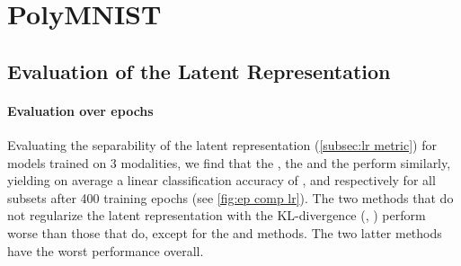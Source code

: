 \section{PolyMNIST} \label{subsec: results polymnist}

\subsection{Evaluation of the Latent Representation}

\paragraph{Evaluation over epochs}
Evaluating the separability of the latent representation (\cref{subsec:lr metric}) for models trained on 3 modalities, we find that the , the  and the  perform similarly, yielding on average a linear classification accuracy of ,  and  respectively for all subsets after 400 training epochs (see \cref{fig:ep comp lr}).
The two methods that do not regularize the latent representation with the KL-divergence (, ) perform worse than those that do, except for the  and  methods.
The two latter methods have the worst performance overall.

\begin{sansmath}
\end{sansmath}

